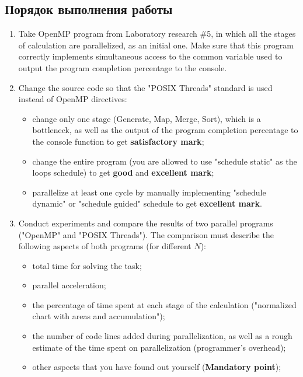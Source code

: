 { %
	\subsection{Порядок выполнения работы}
	\begin{enumerate}
		\item Take OpenMP program from Laboratory research \#5, in which all the stages of calculation are parallelized, as an initial one. Make sure that this program correctly implements simultaneous access to the common variable used to output the program completion percentage to the console.
		\item Change the source code so that the "POSIX Threads" standard is used instead of OpenMP directives:
			\begin{itemize}
				\item change only one stage (Generate, Map, Merge, Sort), which is a bottleneck, as well as the output of the program completion percentage to the console function to get \textbf{satisfactory mark};
				\item change the entire program (you are allowed to use "schedule static" as the loops schedule) to get \textbf{good} and \textbf{excellent mark};
				\item parallelize at least one cycle by manually implementing "schedule dynamic" or "schedule guided" schedule to get \textbf{excellent mark}.
			\end{itemize}
		\item Conduct experiments and compare the results of two parallel programs ("OpenMP" and "POSIX Threads"). The comparison must describe the following aspects of both programs (for different $N$):
			\begin{itemize}
				\item total time for solving the task;
				\item parallel acceleration;
				\item the percentage of time spent at each stage of the calculation ("normalized chart with areas and accumulation");
				\item the number of code lines added during parallelization, as well as a rough estimate of the time spent on parallelization (programmer's overhead);
				\item other aspects that you have found out yourself (\textbf{Mandatory point});
			\end{itemize}
	\end{enumerate}
}